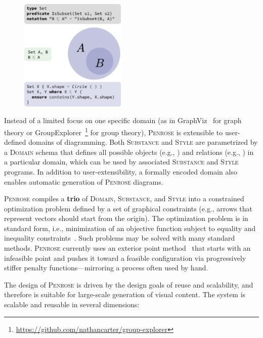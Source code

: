 \documentclass[12pt]{cmuthesis}
\makeatletter
\newcommand*{\eg}{e.g.\@\xspace}
\newcommand*{\ie}{i.e.\@\xspace}
\newcommand*{\Penrose}{\textsc{Penrose}\xspace}
\newcommand*{\Substance}{\textsc{Substance}\xspace}
\newcommand*{\Domain}{\textsc{Domain}\xspace}
\newcommand*{\Style}{\textsc{Style}\xspace}
\newcommand\sub[1]{\Colorbox{sub}{\lstinline{#1}}}
\makeatother
\begin{document}
\setlength{\columnsep}{1em}
\setlength{\intextsep}{0em}
\begin{figure}
\vspace{-10pt}
  \begin{center}
    \includegraphics[width=0.45\textwidth]{assets/chapter-2/penrose-trio.pdf}
  \end{center}
\end{figure}

Instead of a limited focus on one specific domain (as in GraphViz~\cite{graphviz} for graph theory or GroupExplorer~\footnote{\url{https://github.com/nathancarter/group-explorer}} for group theory), \Penrose is extensible to user-defined domains of diagramming. Both \Substance and \Style are parametrized by a \colorbox[HTML]{DBDBDB}{\Domain} schema that defines all possible objects (\eg, \sub{Set}) and relations (\eg, \sub{IsSubset}) in a particular domain, which can be used by associated \Substance and \Style programs. In addition to user-extensibility, a formally encoded domain also enables automatic generation of \Penrose diagrams. 

\Penrose compiles a \textbf{trio} of \Domain, \Substance, and \Style into a constrained optimization problem defined by a set of graphical constraints (\eg, arrows that represent vectors should start from the origin). The optimization problem is in standard form, \ie, minimization of an objective function subject to equality and inequality constraints~\cite{convexOptimization}. Such problems may be solved with many standard methods. \Penrose currently uses an exterior point method~\cite{exteriorPoint} that starts with an infeasible point and pushes it toward a feasible configuration via progressively stiffer penalty functions---mirroring a process often used by hand.

The design of \Penrose is driven by the design goals of reuse and scalability, and therefore is suitable for large-scale generation of visual content. The system is scalable and reusable in several dimensions:
    
\end{document}
